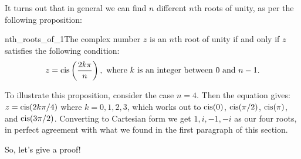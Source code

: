 It turns out that in general we can find $n$ different $n$th roots of unity, as per the following proposition:

\begin{prop}{nth_roots_of_1}The complex number $z$ is an $n$th root of unity if and only if $z$ satisfies the following condition:
\[
z=\operatorname{cis}\left(\frac{2k\pi}{n}\right), \text{ where } k \text{ is an integer between }0 \text{ and } n-1.\] 
\end{prop}

To illustrate this proposition, consider the case $n=4$. Then the equation gives: $z=\operatorname{cis}(2k\pi/4)$  where $k=0,1,2,3$, which works out to $\operatorname{cis}(0)$, $\operatorname{cis}(\pi/2)$, $\operatorname{cis}(\pi)$, and $\operatorname{cis}(3\pi/2)$.  Converting to Cartesian form we get  $1, i , -1, -i$ as our four roots, in perfect agreement with what we found in the first paragraph of this section.

So, let's give a proof!

